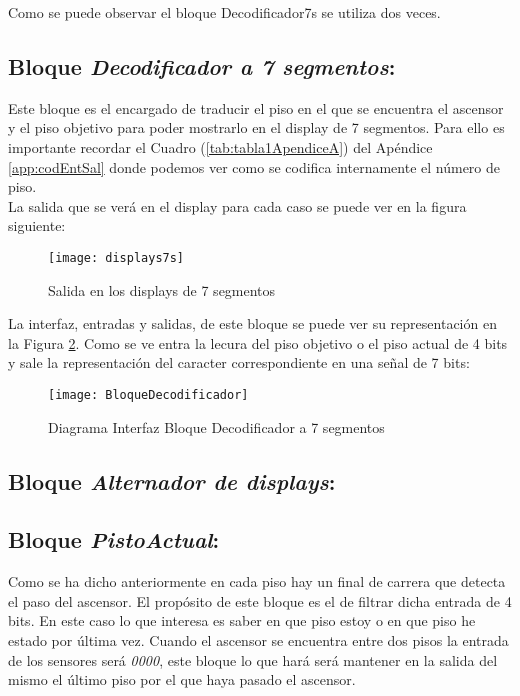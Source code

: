 	Como se puede observar el bloque Decodificador7s se utiliza dos veces. \\ 


\subsection{Bloque \textit{Decodificador a 7 segmentos}:} \label{bloque:Decodificador7s}
    Este bloque es el encargado de traducir el piso en el que se encuentra el ascensor y el piso objetivo para poder mostrarlo en el display de 7 segmentos. Para ello es importante recordar el Cuadro (\ref{tab:tabla1ApendiceA}) del Apéndice \ref{app:codEntSal} donde podemos ver como se codifica internamente el número de piso. \\ 
    
    La salida que se verá en el display para cada caso se puede ver en la figura siguiente:
    
    \begin{figure}[H]
		    \centering
		    \texttt{[image: displays7s]}
		    \caption{Salida en los displays de 7 segmentos}
		    \label{fig:displays7s}
	\end{figure}
    
    La interfaz, entradas y salidas, de este bloque se puede ver su representación en la Figura \ref{fig:BloqueDecodificador7seg}. Como se ve entra la lecura del piso objetivo o el piso actual de 4 bits y sale la representación del caracter correspondiente en una señal de 7 bits:
    
    \begin{figure}[H]
		    \centering
		    \texttt{[image: BloqueDecodificador]}
		    \caption{Diagrama Interfaz Bloque Decodificador a 7 segmentos}
		    \label{fig:BloqueDecodificador7seg}
	\end{figure}
\subsection{Bloque \textit{Alternador de displays}:} \label{bloque:AlternadorDisplay}

\subsection{Bloque \textit{PistoActual}:} \label{bloque:PisoActual}
    Como se ha dicho anteriormente en cada piso hay un final de carrera que detecta el paso del ascensor. El propósito de este bloque es el de filtrar dicha entrada de 4 bits. En este caso lo que interesa es saber en que piso estoy o en que piso he estado por última vez. Cuando el ascensor se encuentra entre dos pisos la entrada de los sensores será \textit{0000}, este bloque lo que hará será mantener en la salida del mismo el último piso por el que haya pasado el ascensor. \\ 
    

